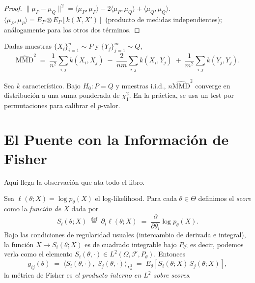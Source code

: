 \begin{proof}
	$\|\mu_P - \mu_Q\|^2 = \langle \mu_P, \mu_P\rangle - 2\langle \mu_P,\mu_Q\rangle
	+ \langle \mu_Q, \mu_Q\rangle$.  $\langle \mu_P, \mu_P\rangle = E_P \otimes E_P
	[k(X,X')]$ (producto de medidas independientes); análogamente para los otros
	dos términos.
\end{proof}

\begin{proposition}
	\label{prop:mmd-empirical}
	Dadas muestras $\{X_i\}_{i=1}^n \sim P$ y $\{Y_j\}_{j=1}^m \sim Q$,
	\[
	\widehat{\mathrm{MMD}}^2 \;=\; \frac{1}{n^2}\sum_{i,j} k(X_i,X_j)
	\;-\; \frac{2}{nm}\sum_{i,j} k(X_i,Y_j)
	\;+\; \frac{1}{m^2}\sum_{i,j} k(Y_j,Y_j).
	\]
\end{proposition}

\begin{theorem}
	\label{thm:two-sample}
	Sea $k$ característico.  Bajo $H_0: P = Q$ y muestras i.i.d., $n\widehat{\mathrm{MMD}}^2$
	converge en distribución a una suma ponderada de $\chi^2_1$.  En la práctica,
	se usa un test por permutaciones para calibrar el $p$-valor.
\end{theorem}

\section{El Puente con la Información de Fisher}

Aquí llega la observación que ata todo el libro.

\begin{theorem}
	\label{thm:fisher-l2}
	Sea $\ell(\theta; X) = \log p_\theta(X)$ el log-likelihood.  Para cada
	$\theta \in \Theta$ definimos el \emph{score} como la \emph{función de $X$}
	dada por
	\[
	S_i(\theta; X) \;\stackrel{\text{def}}{=}\; \partial_i \ell(\theta; X)
	\;=\; \frac{\partial}{\partial \theta_i} \log p_\theta(X).
	\]
	Bajo las condiciones de regularidad usuales (intercambio de derivada e
	integral), la función $X \mapsto S_i(\theta; X)$ es de cuadrado integrable
	bajo $P_\theta$; es decir, podemos verla como el elemento
	$S_i(\theta, \cdot) \in L^2(\Omega, \mathcal{F}, P_\theta)$.  Entonces
	\[
	g_{ij}(\theta) \;=\;
	\langle S_i(\theta, \cdot),\; S_j(\theta, \cdot) \rangle_{L^2_{\theta}}
	\;=\; E_\theta\!\left[S_i(\theta; X)\, S_j(\theta; X)\right],
	\]
	la métrica de Fisher es \emph{el producto interno en $L^2$ sobre scores}.
\end{theorem}


